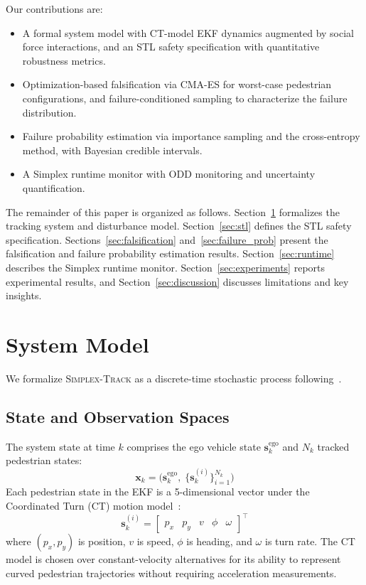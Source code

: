 \documentclass[conference]{IEEEtran}
\begin{document}
Our contributions are:
\begin{itemize}
    \item A formal system model with CT-model EKF dynamics augmented by social force interactions, and an STL safety specification with quantitative robustness metrics.
    \item Optimization-based falsification via CMA-ES for worst-case pedestrian configurations, and failure-conditioned sampling to characterize the failure distribution.
    \item Failure probability estimation via importance sampling and the cross-entropy method, with Bayesian credible intervals.
    \item A Simplex runtime monitor with ODD monitoring and uncertainty quantification.
\end{itemize}

The remainder of this paper is organized as follows. Section~\ref{sec:system} formalizes the tracking system and disturbance model. Section~\ref{sec:stl} defines the STL safety specification. Sections~\ref{sec:falsification} and~\ref{sec:failure_prob} present the falsification and failure probability estimation results. Section~\ref{sec:runtime} describes the Simplex runtime monitor. Section~\ref{sec:experiments} reports experimental results, and Section~\ref{sec:discussion} discusses limitations and key insights.

\section{System Model}
\label{sec:system}

We formalize \textsc{Simplex-Track} as a discrete-time stochastic process following~\cite{kochenderfer2025validation}.

\subsection{State and Observation Spaces}

The system state at time $k$ comprises the ego vehicle state $\mathbf{s}_k^{\text{ego}}$ and $N_k$ tracked pedestrian states:
\begin{equation}
    \mathbf{x}_k = \bigl(\mathbf{s}_k^{\text{ego}},\; \{\mathbf{s}_k^{(i)}\}_{i=1}^{N_k}\bigr)
\end{equation}
Each pedestrian state in the EKF is a 5-dimensional vector under the Coordinated Turn (CT) motion model~\cite{li2003survey}:
\begin{equation}
    \mathbf{s}^{(i)}_k = \begin{bmatrix} p_x & p_y & v & \phi & \omega \end{bmatrix}^\top
    \label{eq:ct_state}
\end{equation}
where $(p_x, p_y)$ is position, $v$ is speed, $\phi$ is heading, and $\omega$ is turn rate. The CT model is chosen over constant-velocity alternatives for its ability to represent curved pedestrian trajectories without requiring acceleration measurements.
\end{document}
